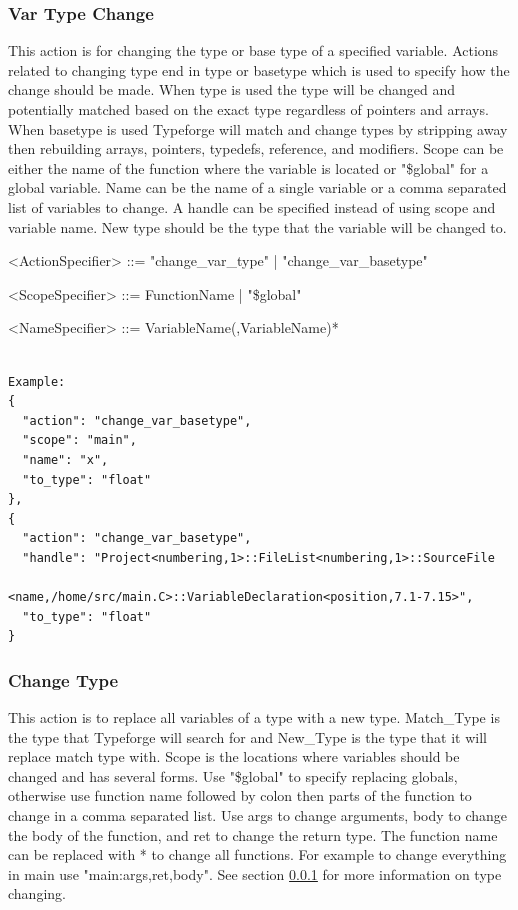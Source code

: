 \documentclass[natbib]{article}
\begin{document}
\subsubsection{Var Type Change} \label{sec:vartypechange}
This action is for changing the type or base type of a specified variable. Actions related to 
changing type end in type or basetype which is used to specify how the change should be made. 
When type is used the type will be changed and potentially matched based on the exact type 
regardless of pointers and arrays. When basetype is used Typeforge will match and change types 
by stripping away then rebuilding arrays, pointers, typedefs, reference, and modifiers. 
Scope can be either the name of the function where the variable is located or "\$global" 
for a global variable. Name can be the name of a single variable or a comma separated 
list of variables to change. A handle can be specified instead of using scope and variable name. New type 
should be the type that the variable will be changed to.

\begin{grammar}
<ActionSpecifier> ::= "change_var_type" | "change_var_basetype"

<ScopeSpecifier>    ::= FunctionName | "\$global"

<NameSpecifier>     ::= VariableName(,VariableName)*
\end{grammar}
\begin{verbatim}

Example:
{
  "action": "change_var_basetype",
  "scope": "main",
  "name": "x",
  "to_type": "float"
},
{
  "action": "change_var_basetype",
  "handle": "Project<numbering,1>::FileList<numbering,1>::SourceFile
              <name,/home/src/main.C>::VariableDeclaration<position,7.1-7.15>",
  "to_type": "float"
}
\end{verbatim}

\subsubsection{Change Type} \label{sec:chagetype}
This action is to replace all variables of a type with a new type. Match\_Type is the type that Typeforge
will search for and New\_Type is the type that it will replace match type with.
Scope is the locations where variables should be changed and has several forms. 
Use "\$global" to specify replacing globals, otherwise use function name followed by colon 
then parts of the function to change in a comma separated list. Use args to change arguments, 
body to change the body of the function, and ret to change the return type. The function name 
can be replaced with * to change all functions. For example to change everything in main use 
"main:args,ret,body". See section \ref{sec:vartypechange} for more information on type changing. 
\end{document}
